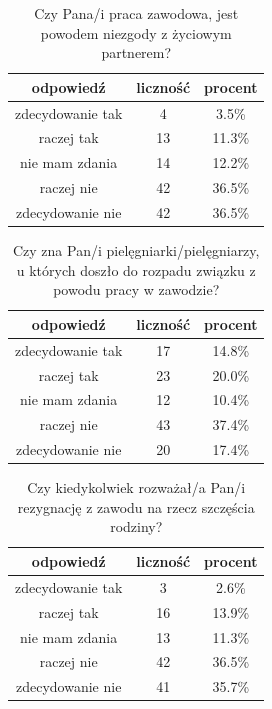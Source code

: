 \documentclass[a4paper,12pt,twoside,openany]{report}
\begin{document}
\begin{table}[h]
\caption{Czy Pana/i praca zawodowa, jest powodem niezgody z życiowym partnerem?}
\centering
\begin{tabular}{ | c | c | c |}
\hline
odpowiedź & liczność & procent\\
\hline
zdecydowanie tak  &  4  & 3.5\% \\
\hline
raczej tak  &  13  & 11.3\% \\
\hline
nie mam zdania  &  14  & 12.2\% \\
\hline
raczej nie  &  42  & 36.5\% \\
\hline
zdecydowanie nie  &  42  & 36.5\% \\
\hline
\end{tabular}
\label{tab:Q28}
\end{table}



\begin{table}[h]
\caption{Czy zna Pan/i pielęgniarki/pielęgniarzy, u których doszło do rozpadu związku z powodu pracy w zawodzie?}
\centering
\begin{tabular}{ | c | c | c |}
\hline
odpowiedź & liczność & procent\\
\hline
zdecydowanie tak  &  17  & 14.8\% \\
\hline
raczej tak  &  23  & 20.0\% \\
\hline
nie mam zdania  &  12  & 10.4\% \\
\hline
raczej nie  &  43  & 37.4\% \\
\hline
zdecydowanie nie  &  20  & 17.4\% \\
\hline
\end{tabular}
\label{tab:Q29}
\end{table}



\begin{table}[h]
\caption{Czy kiedykolwiek rozważał/a Pan/i rezygnację z zawodu na rzecz szczęścia rodziny?}
\centering
\begin{tabular}{ | c | c | c |}
\hline
odpowiedź & liczność & procent\\
\hline
zdecydowanie tak  &  3  & 2.6\% \\
\hline
raczej tak  &  16  & 13.9\% \\
\hline
nie mam zdania  &  13  & 11.3\% \\
\hline
raczej nie  &  42  & 36.5\% \\
\hline
zdecydowanie nie  &  41  & 35.7\% \\
\hline
\end{tabular}
\label{tab:Q30}
\end{table}
\end{document}
